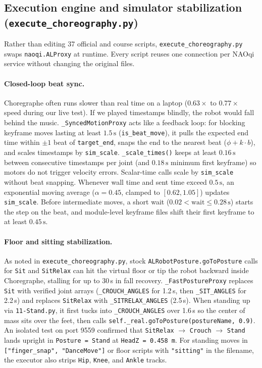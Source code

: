\documentclass[11pt,a4paper]{article}
\newcommand{\code}[1]{\texttt{#1}}
\begin{document}
\subsection{Execution engine and simulator stabilization (\texorpdfstring{\code{execute\_choreography.py}}{execute\_choreography.py})}

Rather than editing 37 official and course scripts, \code{execute\_choreography.py} swaps \code{naoqi.ALProxy} at runtime. Every script reuses one connection per NAOqi service without changing the original files.

\paragraph{Closed-loop beat sync.}
Choregraphe often runs slower than real time on a laptop ($0.63\times$ to $0.77\times$ speed during our live test). If we played timestamps blindly, the robot would fall behind the music. \code{\_SyncedMotionProxy} acts like a feedback loop: for blocking keyframe moves lasting at least $1.5\,\text{s}$ (\code{is\_beat\_move}), it pulls the expected end time within $\pm 1$ beat of \code{target\_end}, snaps the end to the nearest beat ($\phi + k\cdot b$), and scales timestamps by \code{sim\_scale}. \code{\_scale\_times()} keeps at least $0.16\,\text{s}$ between consecutive timestamps per joint (and $0.18\,\text{s}$ minimum first keyframe) so motors do not trigger velocity errors. Scalar-time calls scale by \code{sim\_scale} without beat snapping. Whenever wall time and sent time exceed $0.5\,\text{s}$, an exponential moving average ($\alpha = 0.45$, clamped to $[0.62, 1.05]$) updates \code{sim\_scale}. Before intermediate moves, a short wait ($0.02 < \text{wait} \le 0.28\,\text{s}$) starts the step on the beat, and module-level keyframe files shift their first keyframe to at least $0.45\,\text{s}$.

\paragraph{Floor and sitting stabilization.}
As noted in \code{execute\_choreography.py}, stock \code{ALRobotPosture.goToPosture} calls for \code{Sit} and \code{SitRelax} can hit the virtual floor or tip the robot backward inside Choregraphe, stalling for up to 30\,s in fall recovery. \code{\_FastPostureProxy} replaces \code{Sit} with verified joint arrays (\code{\_CROUCH\_ANGLES} for 1.2\,s, then \code{\_SIT\_ANGLES} for 2.2\,s) and replaces \code{SitRelax} with \code{\_SITRELAX\_ANGLES} (2.5\,s). When standing up via \code{11-Stand.py}, it first tucks into \code{\_CROUCH\_ANGLES} over 1.6\,s so the center of mass sits over the feet, then calls \code{self.\_real.goToPosture(postureName, 0.9)}. An isolated test on port 9559 confirmed that \code{SitRelax} $\to$ \code{Crouch} $\to$ \code{Stand} lands upright in \code{Posture = Stand} at \code{HeadZ = 0.458\,m}. For standing moves in \code{["finger\_snap", "DanceMove"]} or floor scripts with \code{"sitting"} in the filename, the executor also strips \code{Hip}, \code{Knee}, and \code{Ankle} tracks.
\end{document}
